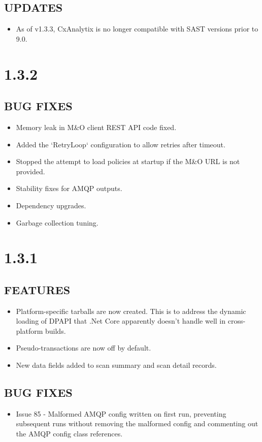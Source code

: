 \subsection*{UPDATES}
    \begin{itemize}
        \item As of v1.3.3, CxAnalytix is no longer compatible with SAST versions prior to 9.0.
    \end{itemize}

\section{1.3.2}
\subsection*{BUG FIXES}
    \begin{itemize}
        \item Memory leak in M\&O client REST API code fixed.
        \item Added the `RetryLoop` configuration to allow retries after timeout.
        \item Stopped the attempt to load policies at startup if the M\&O URL is not provided.
        \item Stability fixes for AMQP outputs.
        \item Dependency upgrades.
        \item Garbage collection tuning.
    \end{itemize}


\section{1.3.1}
\subsection*{FEATURES}
    \begin{itemize}
        \item Platform-specific tarballs are now created.  This is to address the dynamic loading of DPAPI that .Net Core apparently doesn't handle well in cross-platform builds.
        \item Pseudo-transactions are now off by default.
        \item New data fields added to scan summary and scan detail records.
    \end{itemize}

\subsection*{BUG FIXES}
    \begin{itemize}
        \item Issue 85 - Malformed AMQP config written on first run, preventing subsequent runs without removing the malformed config and commenting out the AMQP config class references.
    \end{itemize}


